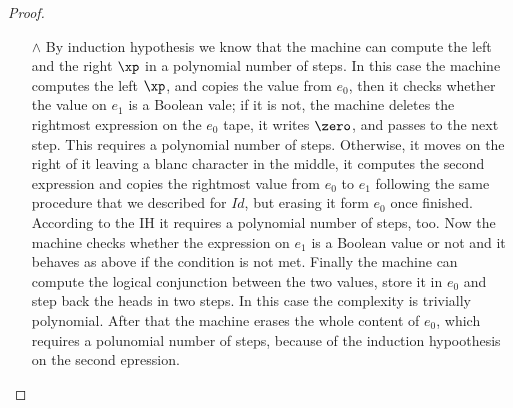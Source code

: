 \begin{proof}
\begin{itemize}
\item[$\land$] By induction hypothesis we know that the machine can compute the left and the right $\xp$ in a polynomial number of steps. In this case the machine computes the left $\xp$, and copies the value from $e_0$, then it checks whether the value on $e_1$ is a Boolean vale; if it is not, the machine deletes the rightmost expression on the $e_0$ tape, it writes $\zero$, and passes to the next step. This requires a polynomial number of steps. Otherwise, it moves on the right of it leaving a blanc character in the middle, it computes the second expression and copies the rightmost value from $e_0$ to $e_1$ following the same procedure that we described for $Id$, but erasing it form $e_0$ once finished. According to the IH it requires a polynomial number of steps, too. Now the machine checks whether the expression on $e_1$ is a Boolean value or not and it behaves as above if the condition is not met. Finally the machine can compute the logical conjunction between the two values, store it in $e_0$ and step back the heads in two steps. In this case the complexity is trivially polynomial. After that the machine erases the whole content of $e_0$, which requires a polunomial number of steps, because of the induction hypoothesis on the second epression.
\end{itemize}


\end{proof}
